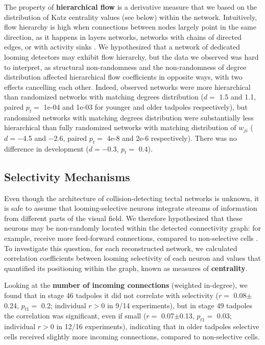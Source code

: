 \documentclass{article}
\begin{document}
The property of \textbf{hierarchical flow} is a derivative measure \citep{mones2012hierarchy} that we based on the distribution of Katz centrality values \citep{katz1953original,fletcher2018katz} (see below) within the network. Intuitively, flow hierarchy is high when connections between nodes largely point in the same direction, as it happens in layers networks, networks with chains of directed edges, or with activity sinks \citep{czegel2015hierarchy}. We hypothesized that a network of dedicated looming detectors may exhibit flow hierarchy, but the data we observed was hard to interpret, as structural non-randomness and the non-randomness of degree distribution affected hierarchical flow coefficients in opposite ways, with two effects cancelling each other. Indeed, observed networks were more hierarchical than randomized networks with matching degrees distribution ($d=$ 1.5 and 1.1, paired $p_t=$ 1e-04 and 1e-03 for younger and older tadpoles respectively), but randomized networks with matching degrees distribution were substantially less hierarchical than fully randomized networks with matching distribution of $w_{ji}$ ($d=-$4.5 and $-$2.6, paired $p_t=$ 4e-8 and 2e-6 respectively). There was no difference in development ($d=-$0.3, $p_t=$ 0.4).

\subsection*{Selectivity Mechanisms}

Even though the architecture of collision-detecting tectal networks is unknown, it is safe to assume that looming-selective neurons integrate streams of information from different parts of the visual field. We therefore hypothesized that these neurons may be non-randomly located within the detected connectivity graph: for example, receive more feed-forward connections, compared to non-selective cells \citep{litwin2014assemblies}. To investigate this question, for each reconstructed network, we calculated correlation coefficients between looming selectivity of each neuron and values that quantified its positioning within the graph, known as measures of \textbf{centrality}.

Looking at the \textbf{number of incoming connections} (weighted in-degree), we found that in stage 46 tadpoles it did not correlate with selectivity ($r=$ 0.08$\pm$0.24, $p_{t1}=$ 0.2; individual $r>$0 in 9/14 experiments), but in stage 49 tadpoles the correlation was significant, even if small ($r=$ 0.07$\pm$0.13, $p_{t1}=$ 0.03; individual $r>$0 in 12/16 experiments), indicating that in older tadpoles selective cells received slightly more incoming connections, compared to non-selective cells.
\end{document}

